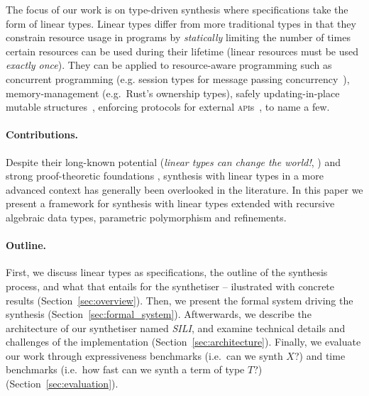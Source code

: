 \documentclass{llncs}
\newcommand{\synname}{\emph{SILI}}
\begin{document}
The focus of our work is on type-driven synthesis where specifications take the
form of linear types.
%
%
Linear types differ from more traditional types in that they constrain resource
usage in programs by \emph{statically} limiting the number of times certain
resources can be used during their lifetime (linear resources must be used
\emph{exactly once}).
%
They can be applied to resource-aware programming such as concurrent programming
(e.g. session types for message passing
concurrency~\cite{DBLP:journals/mscs/CairesPT16}), memory-management
(e.g.~Rust's ownership types), safely updating-in-place mutable
structures~\cite{Bernardy_2018}, enforcing protocols for external \textsc{api}s~\cite{Bernardy_2018}, to name a few.

\paragraph{Contributions.} Despite their long-known potential (\emph{linear
types can change the world!}\cite{Wadler90lineartypes},
\cite{DBLP:journals/mscs/CairesPT16,Bernardy_2018}) and strong proof-theoretic
foundations
\cite{10.1093/logcom/2.3.297,DBLP:conf/cade/ChaudhuriP05,DBLP:journals/tcs/CervesatoHP00},
synthesis with linear types in a more advanced context
has generally been overlooked in the literature.  In this paper we present a framework for synthesis
with linear types extended with recursive algebraic data types, parametric
polymorphism and refinements.


\paragraph{Outline.} First, we discuss linear types as specifications, the
outline of the synthesis process, and what that entails for the synthetiser --
ilustrated with concrete results (Section~\ref{sec:overview}). Then, we present
the formal system driving the synthesis (Section~\ref{sec:formal_system}).
Aftwerwards, we describe the architecture of our synthetiser named \synname, and
examine technical details and challenges of the implementation
(Section~\ref{sec:architecture}). Finally, we evaluate our work through
expressiveness benchmarks (i.e.~can we synth $X$?) and time benchmarks (i.e.~how
fast can we synth a term of type $T$?) (Section~\ref{sec:evaluation}).
\end{document}
